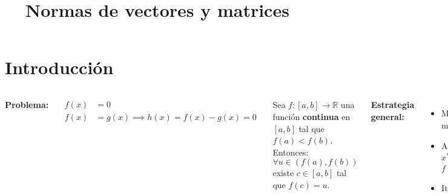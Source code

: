 \documentclass[9pt, aspectratio=169]{beamer}
\title{Normas de vectores y matrices}
\subtitle{}
\begin{document}
\maketitle

\section{Introducción}

\begin{frame}
\begin{columns}[t]
\cx
\textbf{Problema:}

\begin{equation*}
    \begin{split}
        f(x) &= 0 \\
        f(x) &= g(x) \implies h(x) = f(x) - g(x) = 0
    \end{split} 
\end{equation*}

\begin{theorem}
Sea $f: [a, b] \rightarrow \mathbb{R}$ una función \textbf{continua} en $[a, b]$ tal que $f(a) < f(b)$. Entonces: $\forall u \in (f(a), f(b))$ existe $c \in [a, b]$ tal que $f(c) = u$.
\end{theorem}
\pause

\textbf{Estrategia general:} %
\begin{itemize}
    \item Mostrar que existe al menos una solución ($x^*$)
    \item Aislar una raíz: $D \subset \mathbb{R}$, $x^* \in D$ y $f(x) \neq 0 \; \forall x \in D \setminus \{ x^* \}$
    \item Iterar
\end{itemize}
\pause


\end{columns}
\end{frame}
\end{document}
